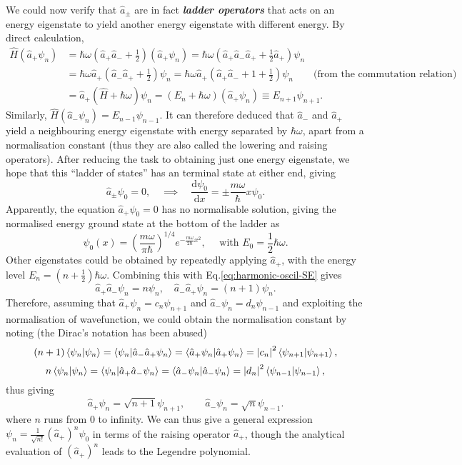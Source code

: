 \documentclass{article}
\theoremstyle{nonumberplain}
\begin{document}
We could now verify that $\hat{a}_\pm$ are in fact \textit{\textbf{ladder operators}} that acts on an energy eigenstate to yield another energy eigenstate with different energy. By direct calculation, 
\[
    \begin{aligned}
        \hat{H} (\hat{a} _+ \psi_n)
        &= \hbar \omega \left(
            \hat{a}_{+} \hat{a}_{-} + \frac{1}{2}
        \right) (\hat{a} _+ \psi_n)
        = \hbar \omega \left(
            \hat{a}_{+} \hat{a}_{-} \hat{a}_+ + \frac{1}{2} \hat{a}_+
        \right)  \psi_n \\
        &= \hbar \omega \hat{a}_{+} \left(
             \hat{a}_{-} \hat{a}_+ + \frac{1}{2} 
        \right)  \psi_n
        = \hbar \omega \hat{a}_{+} \left(
            \hat{a}_{+} \hat{a}_- + 1 + \frac{1}{2} 
       \right)  \psi_n \qquad \text{(from the commutation relation)} \\
       &= \hat{a}_{+} \left(
        \hat{H}  + \hbar \omega 
        \right) \psi_n 
        = (E_n+\hbar \omega ) (\hat{a}_+ \psi_n)
        \equiv E_{n+1} \psi_{n+1}. 
    \end{aligned}
\]
Similarly, $\hat{H} (\hat{a} _- \psi_n) = E_{n-1} \psi_{n-1}.$ It can therefore deduced that $\hat{a}_-$ and $\hat{a}_+$ yield a neighbouring energy eigenstate with energy separated by $\hbar \omega $, apart from a normalisation constant (thus they are also called the lowering and raising operators). After reducing the task to obtaining just one energy eigenstate, we hope that this ``ladder of states'' has an terminal state at either end, giving
\[
    \hat{a}_\pm  \psi_0 = 0, \quad \implies \quad 
    \frac{\mathrm{d}\psi _0}{\mathrm{d}x} = \pm \frac{m \omega }{\hbar } x \psi_0.
\]
Apparently, the equation $\hat{a}_+  \psi_0 = 0$ has no normalisable solution, giving the normalised energy ground state at the bottom of the ladder as 
\[
    \boxed{
        \psi_0(x) = 
        \left( \frac{m \omega }{\pi  \hbar }\right)^{1 /4} e^{-\frac{m \omega }{2 \hbar } x^2}, \quad 
        \text{ with } E_0 = \frac{1}{2} \hbar \omega .
    }
\]
Other eigenstates could be obtained by repeatedly applying $\hat{a} _+$, with the energy level $\boxed{E_n = (n+\frac{1}{2}) \hbar  \omega .}$ Combining this with Eq.\eqref{eq:harmonic-oscil-SE} gives 
\[
    \hat{a}_+ \hat{a}_- \psi_n = n \psi _n, \quad \hat{a}_- \hat{a}_+ \psi_n = (n+1) \psi _n. 
\] 
Therefore, assuming that $\hat{a} _+ \psi_n = c_n \psi _{n+1}$ and $\hat{a} _- \psi_n = d_n \psi _{n-1}$ and exploiting the normalisation of wavefunction, we could obtain the normalisation constant by noting (the Dirac's notation has been abused)
\[
    (n+1) \braket{\psi_n} =\braket{\psi_n}{\hat{a}_- \hat{a}_+ \psi_n} =\braket{ \hat{a}_+ \psi_n} = \left\vert c_n \right\vert ^2 \braket{\psi_{n+1}},
\]
\[
    n \braket{\psi_n} =\braket{\psi_n}{\hat{a}_+ \hat{a}_- \psi_n} =\braket{ \hat{a}_- \psi_n} = \left\vert d_n \right\vert ^2 \braket{\psi_{n-1}},
\]
thus giving 
\[
    \boxed{
    \hat{a} _+ \psi_n = \sqrt{n+1} \psi_{n+1}, 
    \qquad
    \hat{a} _- \psi_n = \sqrt{n} \psi_{n-1}.
    }
\]
where $n$ runs from $0$ to infinity. We can thus give a general expression $\psi_n = \frac{1}{\sqrt{n!} } (\hat{a} _+)^n \psi_0$ in terms of the raising operator $\hat{a} _+$, though the analytical evaluation of $(\hat{a} _+)^n$ leads to the Legendre polynomial. 
\end{document}
